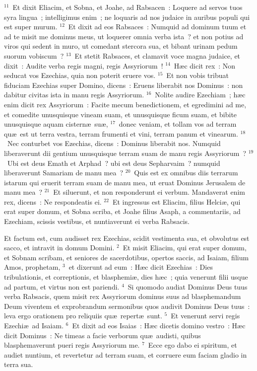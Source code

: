 ${}^{11}$~Et dixit Eliacim, et Sobna, et Joahe, ad Rabsacen~: Loquere ad servos tuos syra lingua~; intelligimus enim~; ne loquaris ad nos judaice in auribus populi qui est super murum.
${}^{12}$~Et dixit ad eos Rabsaces~: Numquid ad dominum tuum et ad te misit me dominus meus, ut loquerer omnia verba ista~? et non potius ad viros qui sedent in muro, ut comedant stercora sua, et bibant urinam pedum suorum vobiscum~?
${}^{13}$~Et stetit Rabsaces, et clamavit voce magna judaice, et dixit~: Audite verba regis magni, regis Assyriorum~!
${}^{14}$~H\ae c dicit rex~: Non seducat vos Ezechias, quia non poterit eruere vos.
${}^{15}$~Et non vobis tribuat fiduciam Ezechias super Domino, dicens~: Eruens liberabit nos Dominus~: non dabitur civitas ista in manu regis Assyriorum.
${}^{16}$~Nolite audire Ezechiam~; h\ae c enim dicit rex Assyriorum~: Facite mecum benedictionem, et egredimini ad me, et comedite unusquisque vineam suam, et unusquisque ficum suam, et bibite unusquisque aquam cistern\ae\ su\ae ,
${}^{17}$~donec veniam, et tollam vos ad terram qu\ae\ est ut terra vestra, terram frumenti et vini, terram panum et vinearum.
${}^{18}$~Nec conturbet vos Ezechias, dicens~: Dominus liberabit nos. Numquid liberaverunt dii gentium unusquisque terram suam de manu regis Assyriorum~?
${}^{19}$~Ubi est deus Emath et Arphad~? ubi est deus Sepharvaim~? numquid liberaverunt Samariam de manu mea~?
${}^{20}$~Quis est ex omnibus diis terrarum istarum qui eruerit terram suam de manu mea, ut eruat Dominus Jerusalem de manu mea~?
${}^{21}$~Et siluerunt, et non responderunt ei verbum. Mandaverat enim rex, dicens~: Ne respondeatis ei.
${}^{22}$~Et ingressus est Eliacim, filius Helci\ae , qui erat super domum, et Sobna scriba, et Joahe filius Asaph, a commentariis, ad Ezechiam, scissis vestibus, et nuntiaverunt ei verba Rabsacis.

\lettrine[lines=3,image=true,loversize=0.05,lraise=-0.03]{E}{}t factum est, cum audisset rex Ezechias, scidit vestimenta sua, et obvolutus est sacco, et intravit in domum Domini.
${}^{2}$~Et misit Eliacim, qui erat super domum, et Sobnam scribam, et seniores de sacerdotibus, opertos saccis, ad Isaiam, filium Amos, prophetam,
${}^{3}$~et dixerunt ad eum~: H\ae c dicit Ezechias~: Dies tribulationis, et correptionis, et blasphemi\ae , dies h\ae c~; quia venerunt filii usque ad partum, et virtus non est pariendi.
${}^{4}$~Si quomodo audiat Dominus Deus tuus verba Rabsacis, quem misit rex Assyriorum dominus suus ad blasphemandum Deum viventem et exprobrandum sermonibus quos audivit Dominus Deus tuus~: leva ergo orationem pro reliquiis qu\ae\ repert\ae\ sunt.
${}^{5}$~Et venerunt servi regis Ezechi\ae\ ad Isaiam.
${}^{6}$~Et dixit ad eos Isaias~: H\ae c dicetis domino vestro~: H\ae c dicit Dominus~: Ne timeas a facie verborum qu\ae\ audisti, quibus blasphemaverunt pueri regis Assyriorum me.
${}^{7}$~Ecce ego dabo ei spiritum, et audiet nuntium, et revertetur ad terram suam, et corruere eum faciam gladio in terra sua.


